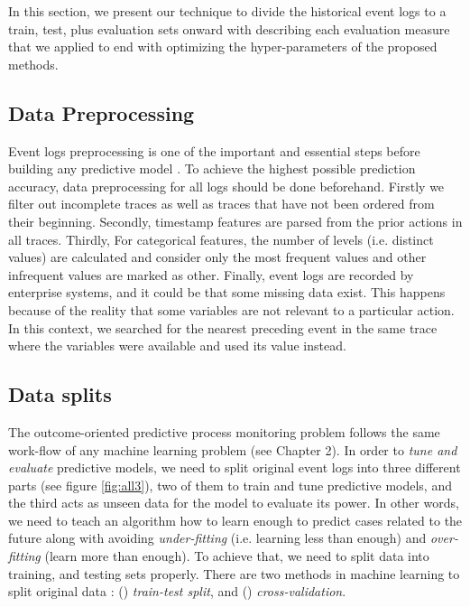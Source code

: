 In this section, we present our technique to divide the historical event logs to a train, test, plus evaluation sets onward with describing each evaluation measure that we applied to end with optimizing the hyper-parameters of the proposed methods. 

\subsection{ Data Preprocessing}
Event logs preprocessing is one of the important and essential steps before building any predictive model \cite{kotsiantis2006data}. To achieve the highest possible prediction accuracy, data preprocessing for all logs should be done beforehand. Firstly we filter out incomplete traces as well as traces that have not been ordered from their beginning.  Secondly, timestamp features are parsed from the prior actions in all traces. Thirdly, For categorical features, the number of levels (i.e. distinct values) are calculated and consider only the most frequent values and other infrequent values are marked as other. Finally, event logs are recorded by enterprise systems, and it could be that some missing data exist. This happens because of the reality that some variables are not relevant to a particular action. In this context, we searched for the nearest preceding event in the same trace where the variables were available and used its value instead.


\subsection{Data splits}
The outcome-oriented predictive process monitoring problem follows the same work-flow of any machine learning problem (see Chapter 2). In order to \textit{tune and evaluate} predictive models, we need to split original event logs into three different parts (see figure \ref{fig:all3}), two of them to train and tune predictive models, and the third acts as unseen data for the model to evaluate its power. In other words, we need to teach an algorithm how to learn enough to predict cases related to the future along with avoiding \textit{under-fitting} (i.e. learning less than enough)  and \textit{over-fitting} (learn more than enough).  To achieve that, we need to split data into training, and testing sets properly.  There are two methods in machine learning to split original data \cite{mitchell1997machine}: () \textit{train-test split}, and () \textit{cross-validation}.

